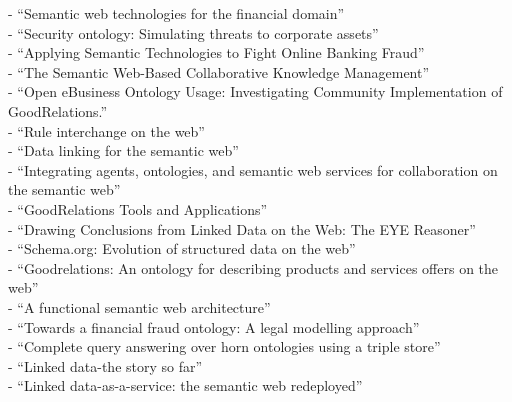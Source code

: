 - ``Semantic web technologies for the financial domain'' \citep{lara2007semantic} \\
- ``Security ontology: Simulating threats to corporate assets'' \citep{ekelhart2006security} \\
- ``Applying Semantic Technologies to Fight Online Banking Fraud'' \citep{carvalhoapplying} \\
- ``The Semantic Web-Based Collaborative Knowledge Management'' \citep{chao2012semantic} \\
- ``Open eBusiness Ontology Usage: Investigating Community Implementation of GoodRelations.'' \citep{ashraf2011open} \\
- ``Rule interchange on the web'' \citep{boley2007rule} \\
- ``Data linking for the semantic web'' \citep{scharffe2011data} \\
- ``Integrating agents, ontologies, and semantic web services for collaboration on the semantic web'' \citep{stollberg2005integrating} \\
- ``GoodRelations Tools and Applications'' \citep{hepp2009goodrelations} \\
- ``Drawing Conclusions from Linked Data on the Web: The EYE Reasoner'' \citep{verborgh2015drawing} \\
- ``Schema.org: Evolution of structured data on the web'' \citep{guha2016schema} \\
- ``Goodrelations: An ontology for describing products and services offers on the web'' \citep{hepp2008goodrelations} \\
- ``A functional semantic web architecture'' \citep{gerber2008functional} \\
- ``Towards a financial fraud ontology: A legal modelling approach'' \citep{kingston2004towards} \\
- ``Complete query answering over horn ontologies using a triple store'' \citep{zhou2013complete} \\
- ``Linked data-the story so far'' \citep{bizer2009linked} \\
- ``Linked data-as-a-service: the semantic web redeployed'' \citep{rietveld2015linked}

